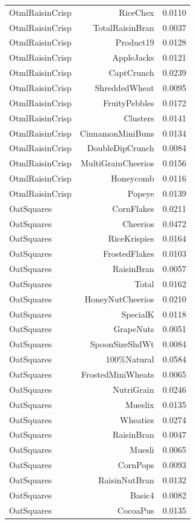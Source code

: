 \begin{longtable}{@{}lrr@{}}
OtmlRaisinCrisp & RiceChex & 0.0110 \\
OtmlRaisinCrisp & TotalRaisinBran & 0.0037 \\
OtmlRaisinCrisp & Product19 & 0.0128 \\
OtmlRaisinCrisp & AppleJacks & 0.0121 \\
OtmlRaisinCrisp & CaptCrunch & 0.0239 \\
OtmlRaisinCrisp & ShreddedWheat & 0.0095 \\
OtmlRaisinCrisp & FruityPebbles & 0.0172 \\
OtmlRaisinCrisp & Clusters & 0.0141 \\
OtmlRaisinCrisp & CinnamonMiniBuns & 0.0134 \\
OtmlRaisinCrisp & DoubleDipCrunch & 0.0084 \\
OtmlRaisinCrisp & MultiGrainCheerios & 0.0156 \\
OtmlRaisinCrisp & Honeycomb & 0.0116 \\
OtmlRaisinCrisp & Popeye & 0.0139 \\
OatSquares & CornFlakes & 0.0211 \\
OatSquares & Cheerios & 0.0472 \\
OatSquares & RiceKrispies & 0.0164 \\
OatSquares & FrostedFlakes & 0.0103 \\
OatSquares & RaisinBran & 0.0057 \\
OatSquares & Total & 0.0162 \\
OatSquares & HoneyNutCheerios & 0.0210 \\
OatSquares & SpecialK & 0.0118 \\
OatSquares & GrapeNuts & 0.0051 \\
OatSquares & SpoonSizeShdWt & 0.0084 \\
OatSquares & 100\%Natural & 0.0584 \\
OatSquares & FrostedMiniWheats & 0.0065 \\
OatSquares & NutriGrain & 0.0246 \\
OatSquares & Mueslix & 0.0135 \\
OatSquares & Wheaties & 0.0274 \\
OatSquares & RaisinBran & 0.0047 \\
OatSquares & Muesli & 0.0065 \\
OatSquares & CornPops & 0.0093 \\
OatSquares & RaisinNutBran & 0.0132 \\
OatSquares & Basic4 & 0.0082 \\
OatSquares & CocoaPus & 0.0135 \\

\end{longtable}
